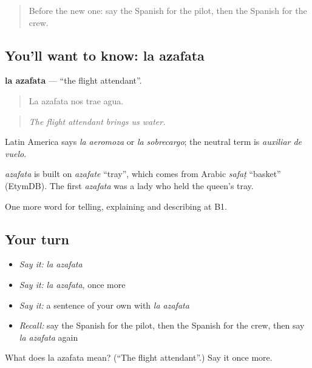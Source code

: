\label{lesson:ES-C654-azafata}



\begin{quote}
Before the new one: say the Spanish for the pilot, then the Spanish for the crew.
\end{quote}

\subsection*{You'll want to know: la azafata}
\textbf{la azafata} — \textquotedblleft{}the flight attendant\textquotedblright{}.

\begin{quote}
La azafata nos trae agua.
\end{quote}

\begin{quote}
\emph{The flight attendant brings us water.}
\end{quote}

Latin America says \emph{la aeromoza} or \emph{la sobrecargo}; the neutral term is \emph{auxiliar de vuelo}.

\begin{cousinweb}
\emph{azafata} is built on \emph{azafate} \textquotedblleft{}tray\textquotedblright{}, which comes from Arabic \emph{safaṭ} \textquotedblleft{}basket\textquotedblright{} (EtymDB). The first \emph{azafata} was a lady who held the queen’s tray.
\end{cousinweb}

\begin{grammarlens}[title={What you've built}]
One more word for telling, explaining and describing at B1.
\end{grammarlens}

\subsection*{Your turn}
\begin{itemize}
\raggedright
  \item \emph{Say it:} \emph{la azafata}
  \item \emph{Say it:} \emph{la azafata}, once more
  \item \emph{Say it:} a sentence of your own with \emph{la azafata}
  \item \emph{Recall:} say the Spanish for the pilot, then the Spanish for the crew, then say \emph{la azafata} again
\end{itemize}

\begin{tcolorbox}[breakable,colback=teal!4,colframe=teal!35!black,title={Before you move on}]
What does la azafata mean? (\textquotedblleft{}The flight attendant\textquotedblright{}.) Say it once more.
\end{tcolorbox}
